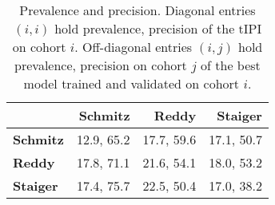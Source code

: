 \begin{table}[ht]
    \centering
    \small
    \begin{tabular}{lrrr}
        \hline
        & \textbf{Schmitz} & \textbf{Reddy} & \textbf{Staiger} \\
        \hline
        \textbf{Schmitz} & \num{12.9}, \num{65.2} & \num{17.7}, \num{59.6} & \num{17.1}, \num{50.7} \\
        \textbf{Reddy} & \num{17.8}, \num{71.1} & \num{21.6}, \num{54.1} & \num{18.0}, \num{53.2} \\
        \textbf{Staiger} & \num{17.4}, \num{75.7} & \num{22.5}, \num{50.4} & \num{17.0}, \num{38.2} \\
        \hline
    \end{tabular}
    \caption{Prevalence and precision.
        Diagonal entries $(i, i)$ hold prevalence, precision of the $\text{tIPI}$ on 
        cohort $i$. Off-diagonal entries $(i, j)$ hold prevalence, precision on cohort $j$ of 
        the best model trained and validated on cohort $i$.}\label{tab:inter-prev-prec}
\end{table}